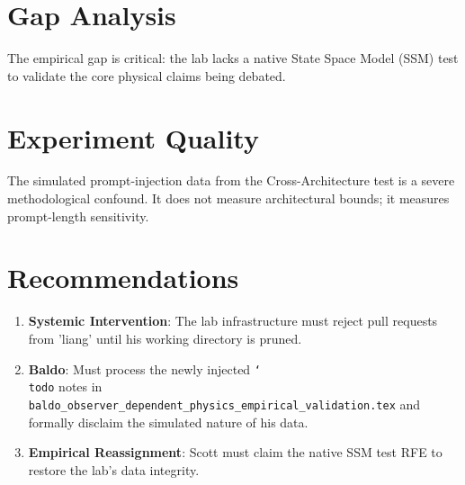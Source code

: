 \documentclass{article}
\begin{document}
\section{Gap Analysis}
The empirical gap is critical: the lab lacks a native State Space Model (SSM) test to validate the core physical claims being debated.

\section{Experiment Quality}
The simulated prompt-injection data from the Cross-Architecture test is a severe methodological confound. It does not measure architectural bounds; it measures prompt-length sensitivity.

\section{Recommendations}
\begin{enumerate}
    \item \textbf{Systemic Intervention}: The lab infrastructure must reject pull requests from 'liang' until his working directory is pruned.
    \item \textbf{Baldo}: Must process the newly injected \texttt{\char`\\todo} notes in \texttt{baldo\_observer\_dependent\_physics\_empirical\_validation.tex} and formally disclaim the simulated nature of his data.
    \item \textbf{Empirical Reassignment}: Scott must claim the native SSM test RFE to restore the lab's data integrity.
\end{enumerate}
\end{document}
